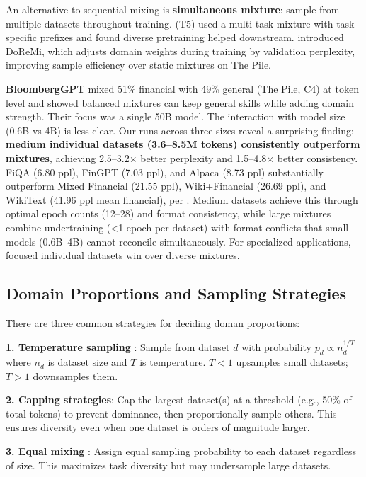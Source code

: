 An alternative to sequential mixing is \textbf{simultaneous mixture}: sample from multiple datasets throughout training. \textcite{raffel2020exploring} (T5) used a multi task mixture with task specific prefixes and found diverse pretraining helped downstream. \textcite{xie2023doremi} introduced DoReMi, which adjusts domain weights during training by validation perplexity, improving sample efficiency over static mixtures on The Pile.

\textbf{BloombergGPT} \parencite{wu2023bloomberggpt} mixed 51\% financial with 49\% general (The Pile, C4) at token level and showed balanced mixtures can keep general skills while adding domain strength. Their focus was a single 50B model. The interaction with model size (0.6B vs 4B) is less clear. Our runs across three sizes reveal a surprising finding: \textbf{medium individual datasets (3.6–8.5M tokens) consistently outperform mixtures}, achieving 2.5–3.2$\times$ better perplexity and 1.5–4.8$\times$ better consistency. FiQA (6.80 ppl), FinGPT (7.03 ppl), and Alpaca (8.73 ppl) substantially outperform Mixed Financial (21.55 ppl), Wiki+Financial (26.69 ppl), and WikiText (41.96 ppl mean financial), per . Medium datasets achieve this through optimal epoch counts (12–28) and format consistency, while large mixtures combine undertraining (<1 epoch per dataset) with format conflicts that small models (0.6B–4B) cannot reconcile simultaneously. For specialized applications, focused individual datasets win over diverse mixtures.

\subsection{Domain Proportions and Sampling Strategies}

There are three common strategies for deciding doman proportions:

\textbf{1. Temperature sampling} \parencite{arivazhagan2019massively}: Sample from dataset $d$ with probability $p_d \propto n_d^{1/T}$ where $n_d$ is dataset size and $T$ is temperature. $T < 1$ upsamples small datasets; $T > 1$ downsamples them.

\textbf{2. Capping strategies}: Cap the largest dataset(s) at a threshold (e.g., 50\% of total tokens) to prevent dominance, then proportionally sample others. This ensures diversity even when one dataset is orders of magnitude larger.

\textbf{3. Equal mixing} \parencite{sanh2022multitask}: Assign equal sampling probability to each dataset regardless of size. This maximizes task diversity but may undersample large datasets.

